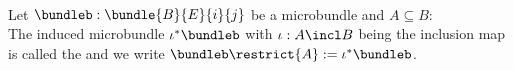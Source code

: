\\ Let $\bundleb: \bundle{B}{E}{i}{j}$ be a microbundle and $A \subseteq B$:
\\ The induced microbundle $\iota^*\bundleb$ with $\iota: A \incl B$ being the inclusion map is called the  and we write $\bundleb \restrict{A} := \iota^*\bundleb$.